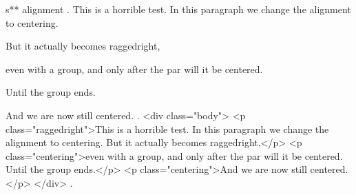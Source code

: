 s** alignment
.
This is a horrible test.
\centering
In this paragraph we change the alignment to centering.
{\raggedright But it actually becomes raggedright,

even with a group, and only after the par will it be centered.}
Until the group ends.

And we are now still centered.
.
<div class="body">
<p class="raggedright">This is a horrible test. In this paragraph we change the alignment to centering. But it actually becomes raggedright,</p>
<p class="centering">even with a group, and only after the par will it be centered.​ Until the group ends.</p>
<p class="centering">And we are now still centered.</p>
</div>
.

